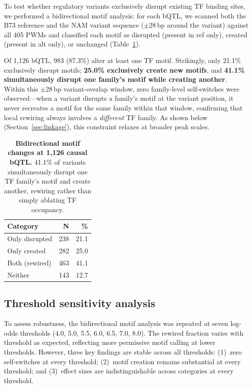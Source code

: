 \documentclass[11pt,a4paper]{article}
\begin{document}
To test whether regulatory variants exclusively disrupt existing TF binding
sites, we performed a bidirectional motif analysis: for each bQTL, we scanned
both the B73 reference and the NAM variant sequence ($\pm$28\,bp around the
variant) against all 405 PWMs and classified each motif as disrupted (present
in ref only), created (present in alt only), or unchanged
(Table~\ref{tab:creation}).

Of 1,126 bQTL, 983 (87.3\%) alter at least one TF motif. Strikingly, only
21.1\% exclusively disrupt motifs; \textbf{25.0\% exclusively create new
motifs}, and \textbf{41.1\% simultaneously disrupt one family's motif while
creating another}. Within this $\pm$28\,bp variant-overlap window, zero
family-level self-switches were observed---when a variant disrupts a family's
motif at the variant position, it never recreates a motif for the same family
within that window, confirming that local rewiring always involves a
\emph{different} TF family. As shown below
(Section~\ref{sec:linkage}), this constraint relaxes at broader peak scales.

\begin{table}[htb]
\centering
\caption{\textbf{Bidirectional motif changes at 1,126 causal bQTL.}
41.1\% of variants simultaneously disrupt one TF family's motif and create
another, rewiring rather than simply ablating TF occupancy.}
\label{tab:creation}
\begin{tabular}{lrr}
\toprule
\textbf{Category} & \textbf{N} & \textbf{\%} \\
\midrule
Only disrupted   & 238 & 21.1 \\
Only created     & 282 & 25.0 \\
Both (rewired)   & 463 & 41.1 \\
Neither          & 143 & 12.7 \\
\bottomrule
\end{tabular}
\end{table}


\subsection{Threshold sensitivity analysis}

To assess robustness, the bidirectional motif analysis was repeated at seven
log-odds thresholds (4.0, 5.0, 5.5, 6.0, 6.5, 7.0, 8.0). The rewired
fraction varies with threshold as expected, reflecting more permissive motif
calling at lower thresholds. However, three key findings are stable across all
thresholds: (1)~zero self-switches at every threshold; (2)~motif creation
remains substantial at every threshold; and (3)~effect sizes are
indistinguishable across categories at every threshold.
\end{document}

